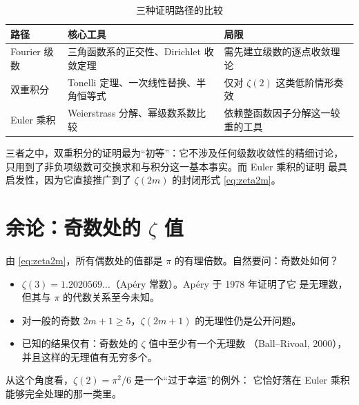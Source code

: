 \documentclass[11pt,a4paper]{ctexart}
\theoremstyle{definition}
\theoremstyle{remark}
\begin{document}
\begin{table}[H]
  \centering
  \small
  \caption{三种证明路径的比较}
  \label{tab:compare}
  \begin{tabular}{@{}>{\raggedright\arraybackslash}p{2.4cm}
                     >{\raggedright\arraybackslash}p{4.9cm}
                     >{\raggedright\arraybackslash}p{4.7cm}@{}}
    \toprule
    \textbf{路径} & \textbf{核心工具} & \textbf{局限} \\
    \midrule
    Fourier 级数
      & 三角函数系的正交性、Dirichlet 收敛定理
      & 需先建立级数的逐点收敛理论 \\
    \addlinespace
    双重积分
      & Tonelli 定理、一次线性替换、半角恒等式
      & 仅对 $\zeta(2)$ 这类低阶情形奏效 \\
    \addlinespace
    Euler 乘积
      & Weierstrass 分解、幂级数系数比较
      & 依赖整函数因子分解这一较重的工具 \\
    \bottomrule
  \end{tabular}
\end{table}

三者之中，双重积分的证明最为``初等''：它不涉及任何级数收敛性的精细讨论，
只用到了非负项级数可交换求和与积分这一基本事实。而 Euler 乘积的证明
最具启发性，因为它直接推广到了 $\zeta(2m)$ 的封闭形式 \eqref{eq:zeta2m}。

\section{余论：奇数处的 \texorpdfstring{$\zeta$}{zeta} 值}

由 \eqref{eq:zeta2m}，所有偶数处的值都是 $\pi$ 的有理倍数。自然要问：奇数处如何？

\begin{itemize}
  \item $\zeta(3)=1.2020569\ldots$（Apéry 常数）。Apéry 于 1978 年证明了它
        是无理数，但其与 $\pi$ 的代数关系至今未知。
  \item 对一般的奇数 $2m+1\ge 5$，$\zeta(2m+1)$ 的无理性仍是公开问题。
  \item 已知的结果仅有：奇数处的 $\zeta$ 值中至少有一个无理数
        （Ball--Rivoal, 2000），并且这样的无理值有无穷多个。
\end{itemize}

从这个角度看，$\zeta(2)=\pi^{2}/6$ 是一个``过于幸运''的例外：
它恰好落在 Euler 乘积能够完全处理的那一类里。
\end{document}
